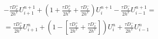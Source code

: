 \message{ !name(main.tex)}\documentclass[a4paper,12pt]{article}
\begin{document}
\begin{multline*}
  - \frac{\tau D^+_x}{2h^2}U^{n+1}_{i+1} + \left(1 + \frac{\tau D^+_x}{2 h^2} + \frac{\tau D^-_x}{2 h^2} \right) U^{n+1}_{i} - \frac{\tau D^-_x}{2h^2}U^{n+1}_{i-1}= \\
  = \frac{\tau D^+_x}{2h^2}U^{n}_{i+1} + \left(1 - \left[ \frac{\tau D^+_x}{2 h^2} + \frac{\tau D^-_x}{2 h^2} \right] \right) U^{n}_{i} + \frac{\tau D^-_x}{2h^2}U^{n}_{i-1}
\end{multline*}
\end{document}
